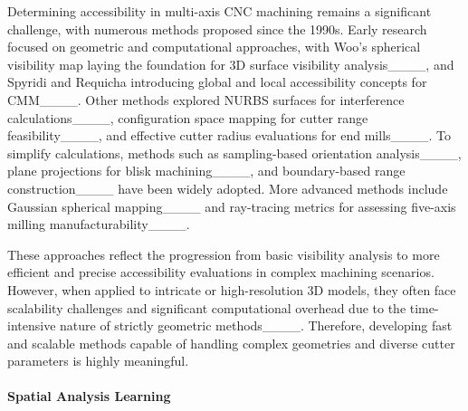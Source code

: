 Determining accessibility in multi-axis CNC machining remains a significant challenge, with numerous methods proposed since the 1990s. Early research focused on geometric and computational approaches, with Woo’s spherical visibility map laying the foundation for 3D surface visibility analysis____, and Spyridi and Requicha introducing global and local accessibility concepts for CMM____. Other methods explored NURBS surfaces for interference calculations____, configuration space mapping for cutter range feasibility____, and effective cutter radius evaluations for end mills____.
To simplify calculations, methods such as sampling-based orientation analysis____, plane projections for blisk machining____, and boundary-based range construction____ have been widely adopted. More advanced methods include Gaussian spherical mapping____ and ray-tracing metrics for assessing five-axis milling manufacturability____.




These approaches reflect the progression from basic visibility analysis to more efficient and precise accessibility evaluations in complex machining scenarios. However, when applied to intricate or high-resolution 3D models, they often face scalability challenges and significant computational overhead due to the time-intensive nature of strictly geometric methods____. Therefore, developing fast and scalable methods capable of handling complex geometries and diverse cutter parameters is highly meaningful.


\paragraph{Spatial Analysis Learning}

